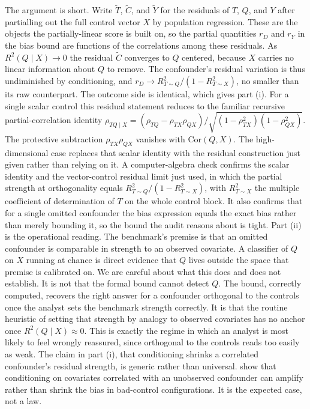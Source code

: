 The argument is short. Write $\tilde T$, $\tilde C$, and $\tilde Y$ for the residuals of $T$, $Q$, and $Y$ after partialling out the full control vector $X$ by population regression. These are the objects the partially-linear score is built on, so the partial quantities $r_D$ and $r_Y$ in the bias bound are functions of the correlations among these residuals. As $R^2(Q \mid X) \to 0$ the residual $\tilde C$ converges to $Q$ centered, because $X$ carries no linear information about $Q$ to remove. The confounder's residual variation is thus undiminished by conditioning, and $r_D \to R^2_{T \sim Q}/(1 - R^2_{T \sim X})$, no smaller than its raw counterpart. The outcome side is identical, which gives part (i). For a single scalar control this residual statement reduces to the familiar recursive partial-correlation identity $\rho_{TQ \mid X} = (\rho_{TQ} - \rho_{TX}\rho_{QX}) / \sqrt{(1 - \rho_{TX}^2)(1 - \rho_{QX}^2)}$. The protective subtraction $\rho_{TX}\rho_{QX}$ vanishes with $\mathrm{Cor}(Q, X)$. The high-dimensional case replaces that scalar identity with the residual construction just given rather than relying on it. A computer-algebra check confirms the scalar identity and the vector-control residual limit just used, in which the partial strength at orthogonality equals
$R^2_{T \sim Q}/(1 - R^2_{T \sim X})$, with $R^2_{T \sim X}$ the multiple coefficient
of determination of $T$ on the whole control block. It also confirms that for a single
omitted confounder the \citet{cinelli2020making} bias expression equals the exact
bias rather than merely bounding it, so the bound the audit reasons about is tight. Part (ii) is the operational reading. The benchmark's premise is that an omitted confounder is comparable in strength to an observed covariate. A classifier of $Q$ on $X$ running at chance is direct evidence that $Q$ lives outside the space that premise is calibrated on. We are careful about what this does and does not establish. It is not that the formal bound cannot detect $Q$. The \citet{cinelli2020making} bound, correctly computed, recovers the right answer for a confounder orthogonal to the controls once the analyst sets the benchmark strength correctly. It is that the routine heuristic of setting that strength by analogy to observed covariates has no anchor once $R^2(Q \mid X) \approx 0$. This is exactly the regime in which an analyst is most likely to feel wrongly reassured, since orthogonal to the controls reads too easily as weak. The claim in part (i), that conditioning shrinks a correlated confounder's residual strength, is generic rather than universal. \citet{middleton2016bias} show that conditioning on covariates correlated with an unobserved confounder can amplify rather than shrink the bias in bad-control configurations. It is the expected case, not a law.

